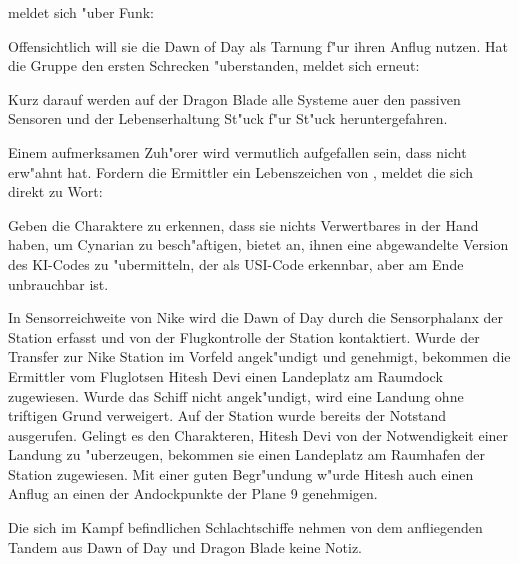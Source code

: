 \xl{} meldet sich "uber Funk:


Offensichtlich will sie die Dawn of Day als Tarnung f"ur ihren Anflug nutzen. Hat die Gruppe den ersten Schrecken "uberstanden, meldet sich \xl{} erneut:


Kurz darauf werden auf der Dragon Blade alle Systeme au\3er den passiven Sensoren und der Lebenserhaltung St"uck f"ur St"uck heruntergefahren. 

Einem aufmerksamen Zuh"orer wird vermutlich aufgefallen sein, dass \xl{} \ml{} nicht erw"ahnt hat. Fordern die Ermittler ein Lebenszeichen von \ml{}, meldet die sich direkt zu Wort:


Geben die Charaktere zu erkennen, dass sie nichts Verwertbares in der Hand haben, um Cynarian zu besch"aftigen, bietet \ml{} an, ihnen eine abgewandelte Version des KI-Codes zu "ubermitteln, der als USI-Code erkennbar, aber am Ende unbrauchbar ist.

In Sensorreichweite von Nike wird die Dawn of Day durch die Sensorphalanx der Station erfasst und von der Flugkontrolle der Station kontaktiert. Wurde der Transfer zur Nike Station im Vorfeld angek"undigt und genehmigt, bekommen die Ermittler vom Fluglotsen Hitesh Devi einen Landeplatz am Raumdock zugewiesen. Wurde das Schiff nicht angek"undigt, wird eine Landung ohne triftigen Grund verweigert. Auf der Station wurde bereits der Notstand ausgerufen. Gelingt es den Charakteren, Hitesh Devi von der Notwendigkeit einer Landung zu "uberzeugen, bekommen sie einen Landeplatz am Raumhafen der Station zugewiesen. Mit einer guten Begr"undung w"urde Hitesh auch einen Anflug an einen der Andockpunkte der Plane 9 genehmigen.

Die sich im Kampf befindlichen Schlachtschiffe nehmen von dem anfliegenden Tandem aus Dawn of Day und Dragon Blade keine Notiz.

